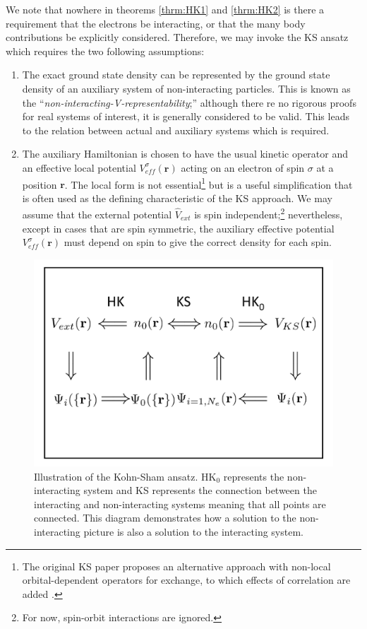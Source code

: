We note that nowhere in theorems \ref{thrm:HK1} and \ref{thrm:HK2} is there a requirement that the electrons be interacting, or that the many body contributions be explicitly considered. Therefore, we may invoke the KS ansatz which requires the two following assumptions:
\begin{enumerate}
    \item The exact ground state density can be represented by the ground state density of an auxiliary system of non-interacting particles. This is known as the ``\textit{non-interacting-V-representability};'' although there re no rigorous proofs for real systems of interest, it is generally considered to be valid. This leads to the relation between actual and auxiliary systems which is required.
    \item The auxiliary Hamiltonian is chosen to have the usual kinetic operator and an effective local potential $V_{eff}^{\sigma}(\textbf{r})$ acting on an electron of spin $\sigma$ at a position $\textbf{r}$. The local form is not essential\footnote{The original KS paper proposes an alternative approach with non-local orbital-dependent operators for exchange, to which effects of correlation are added \cite{KS}.} but is a useful simplification that is often used as the defining characteristic of the KS approach. We may assume that the external potential $\hat{V}_{ext}$ is spin independent;\footnote{For now, spin-orbit interactions are ignored.} nevertheless, except in cases that are spin symmetric, the auxiliary effective potential $V_{eff}^{\sigma}(\textbf{r})$ must depend on spin to give the correct density for each spin.
\end{enumerate}


\begin{figure}[ht!]
    \centering
    \includegraphics[width=0.95\linewidth]{figures/Theory/KS_ansatz.pdf}
    \caption{Illustration of the Kohn-Sham ansatz. HK$_{0}$ represents the non-interacting system and KS represents the connection between the interacting and non-interacting systems meaning that all points are connected. This diagram demonstrates how a solution to the non-interacting picture is also a solution to the interacting system.}
    \label{fig:my_label}
\end{figure}

